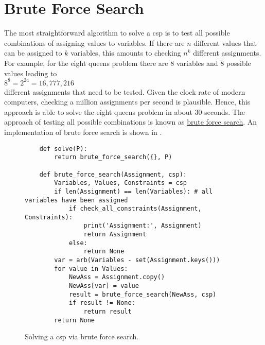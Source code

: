 \section{Brute Force Search}
The most straightforward algorithm to solve a \ac{csp} is to test all possible combinations of assigning
values to variables.  If there are $n$ different values that can be assigned to $k$ variables, this amounts to 
checking $n^k$ different assignments.  For example, for the eight queens problem there are 8 variables and
8 possible values leading to 
\\[0.2cm]
\hspace*{1.3cm}
$8^8 = 2^{24} = 16,777,216$
\\[0.2cm]
different assignments that need to be tested.  Given the clock rate of modern computers, checking a million
assignments per second is plausible.  Hence, this approach is able to solve the eight queens problem in
about 30 seconds.  The approach of testing all possible combinations is known as
\href{https://en.wikipedia.org/wiki/Brute-force_search}{brute force search}.  
An implementation of brute force search is shown in . 

\begin{figure}[!ht]
\centering
\begin{verbatim}
    def solve(P):
        return brute_force_search({}, P)

    def brute_force_search(Assignment, csp):
        Variables, Values, Constraints = csp
        if len(Assignment) == len(Variables): # all variables have been assigned
            if check_all_constraints(Assignment, Constraints):
                print('Assignment:', Assignment)
                return Assignment
            else:
                return None
        var = arb(Variables - set(Assignment.keys()))
        for value in Values:
            NewAss = Assignment.copy()
            NewAss[var] = value
            result = brute_force_search(NewAss, csp)
            if result != None:
                return result
        return None
\end{verbatim}
\vspace*{-0.3cm}
\caption{Solving a \ac{csp} via brute force search.}
\label{fig:Brute-Force-Solver.ipynb}
\end{figure}

